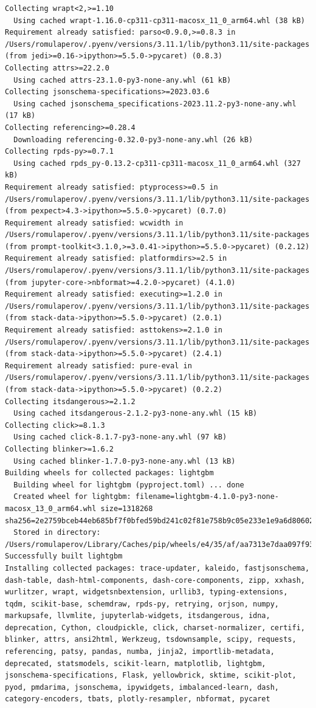 \documentclass[
  letterpaper,
  DIV=11,
  numbers=noendperiod]{scrartcl}
\begin{document}
\begin{verbatim}
Collecting wrapt<2,>=1.10
  Using cached wrapt-1.16.0-cp311-cp311-macosx_11_0_arm64.whl (38 kB)
Requirement already satisfied: parso<0.9.0,>=0.8.3 in /Users/romulaperov/.pyenv/versions/3.11.1/lib/python3.11/site-packages (from jedi>=0.16->ipython>=5.5.0->pycaret) (0.8.3)
Collecting attrs>=22.2.0
  Using cached attrs-23.1.0-py3-none-any.whl (61 kB)
Collecting jsonschema-specifications>=2023.03.6
  Using cached jsonschema_specifications-2023.11.2-py3-none-any.whl (17 kB)
Collecting referencing>=0.28.4
  Downloading referencing-0.32.0-py3-none-any.whl (26 kB)
Collecting rpds-py>=0.7.1
  Using cached rpds_py-0.13.2-cp311-cp311-macosx_11_0_arm64.whl (327 kB)
Requirement already satisfied: ptyprocess>=0.5 in /Users/romulaperov/.pyenv/versions/3.11.1/lib/python3.11/site-packages (from pexpect>4.3->ipython>=5.5.0->pycaret) (0.7.0)
Requirement already satisfied: wcwidth in /Users/romulaperov/.pyenv/versions/3.11.1/lib/python3.11/site-packages (from prompt-toolkit<3.1.0,>=3.0.41->ipython>=5.5.0->pycaret) (0.2.12)
Requirement already satisfied: platformdirs>=2.5 in /Users/romulaperov/.pyenv/versions/3.11.1/lib/python3.11/site-packages (from jupyter-core->nbformat>=4.2.0->pycaret) (4.1.0)
Requirement already satisfied: executing>=1.2.0 in /Users/romulaperov/.pyenv/versions/3.11.1/lib/python3.11/site-packages (from stack-data->ipython>=5.5.0->pycaret) (2.0.1)
Requirement already satisfied: asttokens>=2.1.0 in /Users/romulaperov/.pyenv/versions/3.11.1/lib/python3.11/site-packages (from stack-data->ipython>=5.5.0->pycaret) (2.4.1)
Requirement already satisfied: pure-eval in /Users/romulaperov/.pyenv/versions/3.11.1/lib/python3.11/site-packages (from stack-data->ipython>=5.5.0->pycaret) (0.2.2)
Collecting itsdangerous>=2.1.2
  Using cached itsdangerous-2.1.2-py3-none-any.whl (15 kB)
Collecting click>=8.1.3
  Using cached click-8.1.7-py3-none-any.whl (97 kB)
Collecting blinker>=1.6.2
  Using cached blinker-1.7.0-py3-none-any.whl (13 kB)
Building wheels for collected packages: lightgbm
  Building wheel for lightgbm (pyproject.toml) ... done
  Created wheel for lightgbm: filename=lightgbm-4.1.0-py3-none-macosx_13_0_arm64.whl size=1318268 sha256=2e2759bceb44eb685bf7f0bfed59bd241c02f81e758b9c05e233e1e9a6d80602
  Stored in directory: /Users/romulaperov/Library/Caches/pip/wheels/e4/35/af/aa7313e7daa097f9344c68556c7601715c73d52cabc8d2e500
Successfully built lightgbm
Installing collected packages: trace-updater, kaleido, fastjsonschema, dash-table, dash-html-components, dash-core-components, zipp, xxhash, wurlitzer, wrapt, widgetsnbextension, urllib3, typing-extensions, tqdm, scikit-base, schemdraw, rpds-py, retrying, orjson, numpy, markupsafe, llvmlite, jupyterlab-widgets, itsdangerous, idna, deprecation, Cython, cloudpickle, click, charset-normalizer, certifi, blinker, attrs, ansi2html, Werkzeug, tsdownsample, scipy, requests, referencing, patsy, pandas, numba, jinja2, importlib-metadata, deprecated, statsmodels, scikit-learn, matplotlib, lightgbm, jsonschema-specifications, Flask, yellowbrick, sktime, scikit-plot, pyod, pmdarima, jsonschema, ipywidgets, imbalanced-learn, dash, category-encoders, tbats, plotly-resampler, nbformat, pycaret

\end{verbatim}
\end{document}
